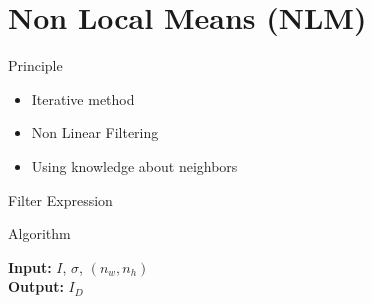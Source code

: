 \section{Non Local Means (NLM)}
\frame{\sectionpage}
    
 \begin{frame}{Principle}

\begin{itemize}
    \item Iterative method
    \item Non Linear Filtering
    \item Using knowledge about neighbors
\end{itemize}

\end{frame}

\begin{frame}{Filter Expression}
\end{frame}

\begin{frame}{Algorithm}
\begin{algorithm}[H]
    \caption{Filtering Algorithm} %
    \begin{algorithmic}[1]
        \newline
        \textbf{Input:} $I$, $\sigma$, $(n_w, n_h)$ \\
        \textbf{Output:} $I_{D}$
        \EndFor
        \EndProcedure
    \end{algorithmic}
\end{algorithm}
\end{frame}

